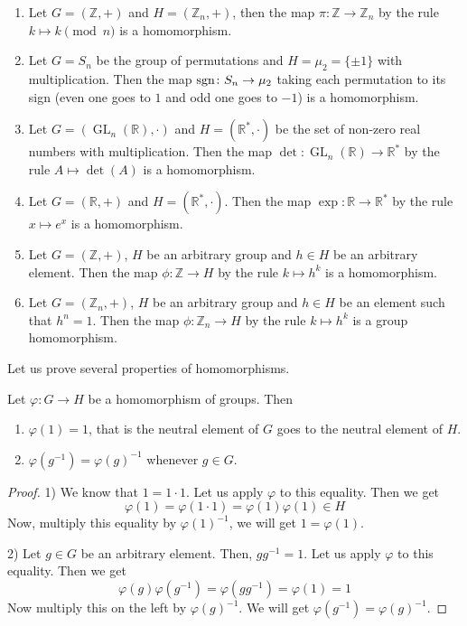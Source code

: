 \begin{examples}
\begin{enumerate}
\item Let $G = (\mathbb Z, +)$ and $H = (\mathbb Z_n, +)$, then the map $\pi\colon \mathbb Z\to \mathbb Z_n$ by the rule $k \mapsto k \pmod n$ is a homomorphism.

\item Let $G = S_n$ be the group of permutations and $H = \mu_2 = \{\pm 1\}$ with multiplication.
Then the map $\operatorname{sgn} \colon S_n \to \mu_2$ taking each permutation to its sign (even one goes to $1$ and odd one goes to $-1$) is a homomorphism.

\item Let $G = (\operatorname{GL}_n(\mathbb R),\cdot)$ and $H = (\mathbb R^*, \cdot)$ be the set of non-zero real numbers with multiplication.
Then the map $\det \colon \operatorname{GL}_n(\mathbb R) \to \mathbb R^*$ by the rule $A \mapsto \det(A)$ is a homomorphism.

\item Let $G = (\mathbb R, +)$ and $H = (\mathbb R^*, \cdot)$.
Then the map $\exp\colon \mathbb R\to \mathbb R^*$ by the rule $x \mapsto e^x$ is a homomorphism.

\item Let $G = (\mathbb Z, +)$, $H$ be an arbitrary group and $h\in H$ be an arbitrary element.
Then the map $\phi\colon \mathbb Z \to H$ by the rule $k \mapsto h^k$ is a homomorphism.

\item Let $G = (\mathbb Z_n, +)$, $H$ be an arbitrary group and $h\in H$ be an element such that $h^n = 1$.
Then the map $\phi\colon \mathbb Z_n \to H$ by the rule $k \mapsto h^k$ is a group homomorphism.
\end{enumerate}
\end{examples}

Let us prove several properties of homomorphisms.

\begin{claim}
\label{claim::HomGrProp}
Let $\varphi\colon G\to H$ be a homomorphism of groups.
Then
\begin{enumerate}
\item $\varphi(1) = 1$, that is the neutral element of $G$ goes to the neutral element of $H$.

\item $\varphi(g^{-1}) = \varphi(g)^{-1}$ whenever $g\in G$.
\end{enumerate}
\end{claim}
\begin{proof}
1) We know that $1 = 1 \cdot 1$.
Let us apply $\varphi$ to this equality.
Then we get
\[
\varphi(1) = \varphi(1 \cdot 1) = \varphi(1) \varphi(1) \in H
\]
Now, multiply this equality by $\varphi(1)^{-1}$, we will get $1 = \varphi(1)$.


2) Let $g\in G$ be an arbitrary element.
Then, $g g^{-1} = 1$.
Let us apply $\varphi$ to this equality.
Then we get
\[
\varphi(g) \varphi(g^{-1}) = \varphi(g g^{-1}) = \varphi(1) = 1
\]
Now multiply this on the left by $\varphi(g)^{-1}$.
We will get $\varphi(g^{-1})  = \varphi(g)^{-1}$.
\end{proof}

